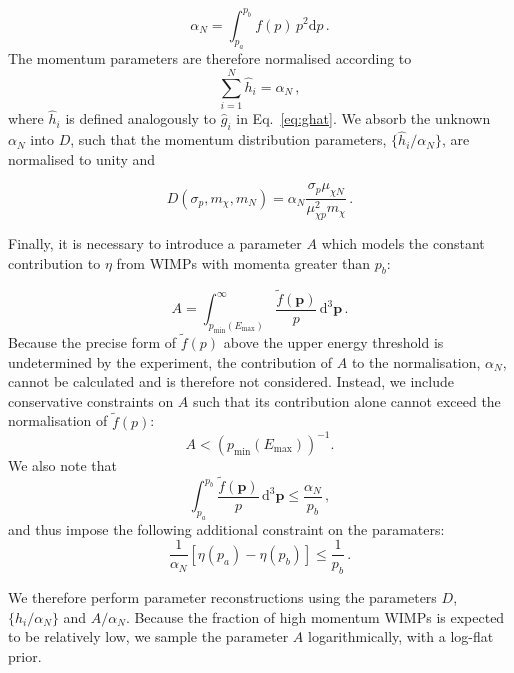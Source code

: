 \begin{equation}
\alpha_N = \int_{p_a}^{p_b} f(p) \, p^2 \textrm{d}p\,.
\end{equation}
The momentum parameters are therefore normalised according to
\begin{equation}
\sum_{i = 1}^N \hat{h}_i = \alpha_N \,,
\end{equation}
where \(\hat{h}_i\) is defined analogously to \(\hat{g}_i\) in Eq.\ \ref{eq:ghat}. We absorb the unknown \(\alpha_N\) into \(D\), such that the momentum distribution parameters, \(\{\hat{h}_i/\alpha_N\}\), are normalised to unity and

\begin{equation}
\label{eq:D}
D(\sigma_p,m_\chi,m_N) = \alpha_N \frac{\sigma_p \mu_{\chi N}}{\mu_{\chi p}^2 m_\chi}\,.
\end{equation}

Finally, it is necessary to introduce a parameter \(A\) which models the constant contribution to \(\eta\) from WIMPs with momenta greater than \(p_b\):

\begin{equation}
A = \int_{p_\textrm{min}(E_\textrm{max})}^\infty \frac{\tilde{f}(\textbf{p})}{p}\, \textrm{d}^3\textbf{p}\,.
\end{equation}
Because the precise form of \(\tilde{f}(p)\) above the upper energy threshold is undetermined by the experiment, the contribution of \(A\) to the normalisation, \(\alpha_N\), cannot be calculated and is therefore not considered. Instead, we include conservative constraints on \(A\) such that its contribution alone cannot exceed the normalisation of \(\tilde{f}(p)\):
\begin{equation}
A < (p_\textrm{min}(E_\textrm{max}))^{-1}.
\end{equation}
We also note that
\begin{equation}
\int_{p_a}^{p_b} \frac{\tilde{f}(\textbf{p})}{p} \, \textrm{d}^3\textbf{p} \leq \frac{\alpha_N}{p_b} \,,
\end{equation}
and thus impose the following additional constraint on the paramaters:
\begin{equation}
\frac{1}{\alpha_N}\left[\eta(p_a) - \eta(p_b)\right] \leq \frac{1}{p_b}\,.
\end{equation}

We therefore perform parameter reconstructions using the parameters \(D\), \(\{h_i/\alpha_N\}\) and \(A/\alpha_N\). Because the fraction of high momentum WIMPs is expected to be relatively low, we sample the parameter \(A\) logarithmically, with a log-flat prior.

